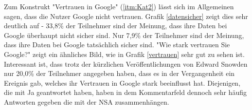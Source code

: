 Zum Konstrukt "Vertrauen in Google" (\ref{itm:Kat2}) lässt sich im Allgemeinen sagen, dass die Nutzer Google nicht vertrauen. Grafik \ref{datensicher} zeigt dies sehr deutlich auf - 33,8\% der Teilnehmer sind der Meinung, dass ihre Daten bei Google überhaupt nicht sicher sind. Nur 7,9\% der Teilnehmer sind der Meinung, dass ihre Daten bei Google tatsächlich sicher sind. "Wie stark vertrauen Sie Google?" zeigt ein ähnliches Bild, wie in Grafik \ref{vertrauen} sehr gut zu sehen ist. Interessant ist, dass trotz der kürzlichen Veröffentlichungen von Edward Snowden nur 20,0\% der Teilnehmer angegeben haben, dass es in der Vergangenheit ein Ereignis gab, welches ihr Vertrauen in Google stark beeinflusst hat. Diejenigen, die mit Ja geantwortet haben, haben in dem Kommentarfeld dennoch sehr häufig Antworten gegeben die mit der NSA zusammenhängen.

